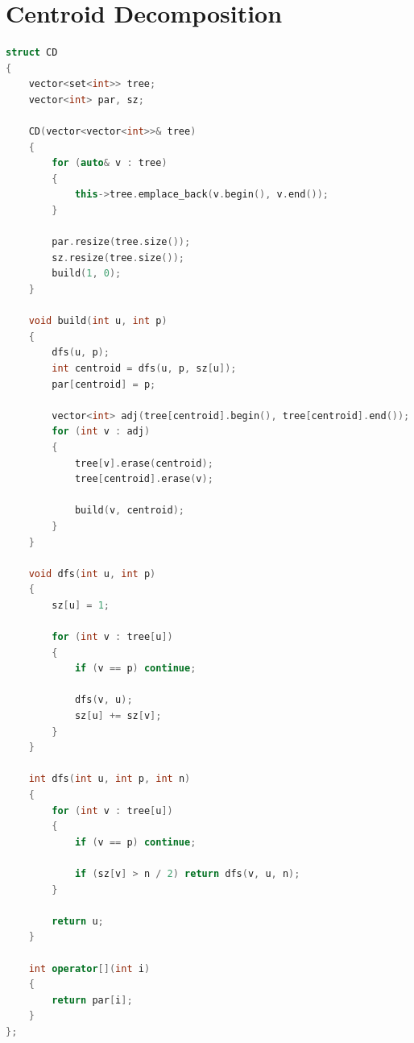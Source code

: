 \section{Centroid Decomposition}
\begin{lstlisting}[language=C++]
struct CD
{
    vector<set<int>> tree;
    vector<int> par, sz;

    CD(vector<vector<int>>& tree)
    {
        for (auto& v : tree)
        {
            this->tree.emplace_back(v.begin(), v.end());
        }

        par.resize(tree.size());
        sz.resize(tree.size());
        build(1, 0);
    }

    void build(int u, int p)
    {
        dfs(u, p);
        int centroid = dfs(u, p, sz[u]);
        par[centroid] = p;

        vector<int> adj(tree[centroid].begin(), tree[centroid].end());
        for (int v : adj)
        {
            tree[v].erase(centroid);
            tree[centroid].erase(v);

            build(v, centroid);
        }
    }

    void dfs(int u, int p)
    {
        sz[u] = 1;

        for (int v : tree[u])
        {
            if (v == p) continue;

            dfs(v, u);
            sz[u] += sz[v];
        }
    }

    int dfs(int u, int p, int n)
    {
        for (int v : tree[u])
        {
            if (v == p) continue;

            if (sz[v] > n / 2) return dfs(v, u, n);
        }

        return u;
    }

    int operator[](int i)
    {
        return par[i];
    }
};
\end{lstlisting}
\sectionend
